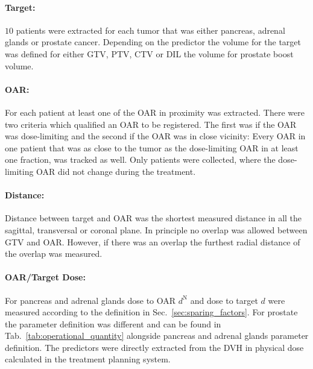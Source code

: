 \documentclass[\relativeRoot/ada.tex]{subfiles}
\begin{document}
\paragraph{Target:} $10$ patients were extracted for each tumor that was either pancreas, adrenal glands or prostate cancer. Depending on the predictor the volume for the target was defined for either GTV, PTV, CTV or DIL the volume for prostate boost volume.

\paragraph{OAR:} For each patient at least one of the OAR in proximity was extracted. There were two criteria which qualified an OAR to be registered. The first was if the OAR was dose-limiting and the second if the OAR was in close vicinity: Every OAR in one patient that was as close to the tumor as the dose-limiting OAR in at least one fraction, was tracked as well. Only patients were collected, where the dose-limiting OAR did not change during the treatment.


\paragraph{Distance:} Distance between target and OAR was the shortest measured distance in all the sagittal, transversal or coronal plane. In principle no overlap was allowed between GTV and OAR. However, if there was an overlap the furthest radial distance of the overlap was measured.

\paragraph{OAR/Target Dose:} For pancreas and adrenal glands dose to OAR $d^{\text{N}}$ and dose to target $d$ were measured according to the definition in Sec.~\ref{sec:sparing_factors}. For prostate the parameter definition was different and can be found in Tab.~\ref{tab:operational_quantity} alongside pancreas and adrenal glands parameter definition. The predictors were directly extracted from the DVH in physical dose calculated in the treatment planning system.
\end{document}
